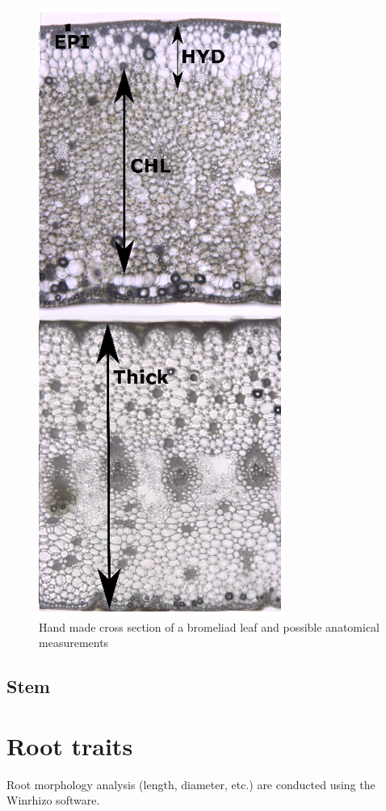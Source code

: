\documentclass[
  12pt,
  american,
  a4paper,
  extrafontsizes,onecolumn,openright
  ]{memoir}
\begin{document}
\begin{figure}

{\centering \includegraphics[width=0.5\linewidth]{document/trait/shootmorpho/meas_anat_tissue} 

}

\caption{Hand made cross section of a bromeliad leaf and possible anatomical measurements}\label{fig:measurements}
\end{figure}

\normalsize

\hypertarget{stem}{%
\subsection{Stem}\label{stem}}

\hypertarget{root-traits}{%
\section{Root traits}\label{root-traits}}

Root morphology analysis (length, diameter, etc.) are conducted using the Winrhizo software.
\end{document}
